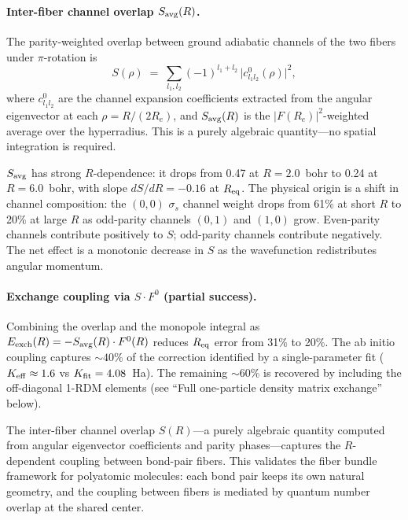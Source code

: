 \documentclass[aps,pra,twocolumn,superscriptaddress,longbibliography,floatfix]{revtex4-2}
\begin{document}
\paragraph{Inter-fiber channel overlap $S_{\rm avg}(R)$.}
The parity-weighted overlap between ground adiabatic channels of the
two fibers under $\pi$-rotation is
\begin{equation}
  S(\rho) \;=\; \sum_{l_1, l_2} (-1)^{l_1 + l_2}\,
  \bigl|c^{0}_{l_1 l_2}(\rho)\bigr|^2,
  \label{eq:S_overlap}
\end{equation}
where $c^{0}_{l_1 l_2}$ are the channel expansion coefficients
extracted from the angular eigenvector at each $\rho = R/(2R_e)$,
and $S_{\rm avg}(R)$ is the $|F(R_e)|^2$-weighted average over
the hyperradius.  This is a purely algebraic quantity---no spatial
integration is required.

$S_{\rm avg}$ has strong $R$-dependence: it drops from 0.47 at
$R = 2.0$~bohr to 0.24 at $R = 6.0$~bohr, with slope
$dS/dR = -0.16$ at $R_{\rm eq}$.  The physical origin is a shift
in channel composition: the $(0{,}0)$ $\sigma_s$ channel weight
drops from 61\% at short $R$ to 20\% at large $R$ as odd-parity
channels $(0{,}1)$ and $(1{,}0)$ grow.  Even-parity channels
contribute positively to $S$; odd-parity channels contribute
negatively.  The net effect is a monotonic decrease in $S$ as the
wavefunction redistributes angular momentum.

\paragraph{Exchange coupling via $S \cdot F^0$ (partial success).}
Combining the overlap and the monopole integral as
$E_{\rm exch}(R) = -S_{\rm avg}(R) \cdot F^0(R)$ reduces $R_{\rm eq}$
error from 31\% to 20\%.  The ab initio coupling captures ${\sim}40\%$
of the correction identified by a single-parameter fit
($K_{\rm eff} \approx 1.6$ vs $K_{\rm fit} = 4.08$~Ha).  The
remaining ${\sim}60\%$ is recovered by including the off-diagonal
1-RDM elements (see ``Full one-particle density matrix exchange''
below).

The inter-fiber channel overlap $S(R)$---a purely algebraic quantity
computed from angular eigenvector coefficients and parity
phases---captures the $R$-dependent coupling between bond-pair fibers.
This validates the fiber bundle framework for polyatomic molecules:
each bond pair keeps its own natural geometry, and the coupling between
fibers is mediated by quantum number overlap at the shared center.
\end{document}
